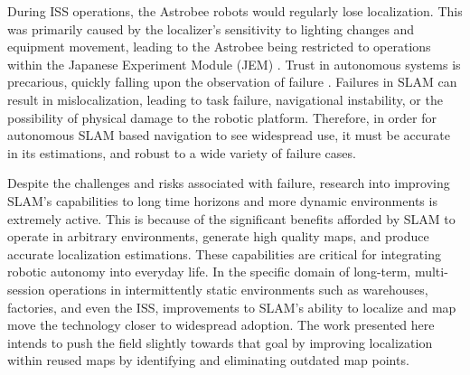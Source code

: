 
During ISS operations, the Astrobee robots would regularly lose localization. This was primarily caused by the localizer's sensitivity to lighting changes and equipment movement, leading to the Astrobee being restricted to operations within the Japanese Experiment Module (JEM) \cite{carlinoLessonsLearnedAstrobee}. Trust in autonomous systems is precarious, quickly falling upon the observation of failure \cite{robinetteEffectRobotPerformance2017}. Failures in SLAM can result in mislocalization, leading to task failure, navigational instability, or the possibility of physical damage to the robotic platform\cite{nahavandiComprehensiveReviewAutonomous2025a}. Therefore, in order for autonomous SLAM based navigation to see widespread use, it must be accurate in its estimations, and robust to a wide variety of failure cases.


Despite the challenges and risks associated with failure, research into improving SLAM's capabilities to long time horizons and more dynamic environments is extremely active. This is because of the significant benefits afforded by SLAM to operate in arbitrary environments, generate high quality maps, and produce accurate localization estimations. These capabilities are critical for integrating robotic autonomy into everyday life. In the specific domain of long-term, multi-session operations in intermittently static environments such as warehouses, factories, and even the ISS, improvements to SLAM's ability to localize and map move the technology closer to widespread adoption.  The work presented here intends to push the field slightly towards that goal by improving localization within reused maps by identifying and eliminating outdated map points.